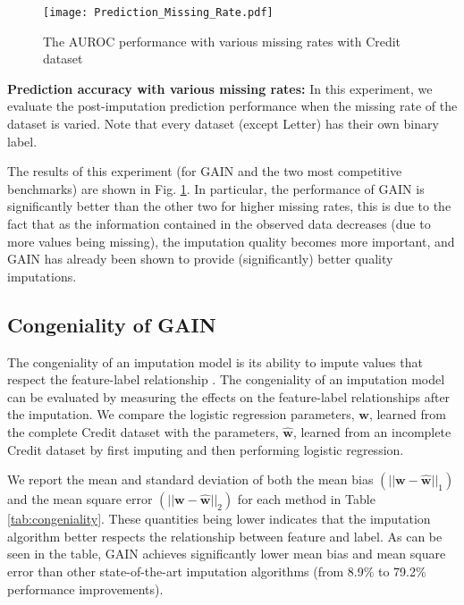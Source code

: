 \documentclass{article}
\begin{document}
\begin{figure}[t!]
	\center
	\texttt{[image: Prediction\_Missing\_Rate.pdf]}
	\caption{The AUROC performance with various missing rates with Credit dataset}
	\label{fig:prediction_missing_rate}
\end{figure}

\textbf{Prediction accuracy with various missing rates: }In this experiment, we evaluate the post-imputation prediction performance when the missing rate of the dataset is varied. Note that every dataset (except Letter) has their own binary label.

The results of this experiment (for GAIN and the two most competitive benchmarks) are shown in Fig. \ref{fig:prediction_missing_rate}. In particular, the performance of GAIN is significantly better than the other two for higher missing rates, this is due to the fact that as the information contained in the observed data decreases (due to more values being missing), the imputation quality becomes more important, and GAIN has already been shown to provide (significantly) better quality imputations.

\subsection{Congeniality of GAIN}



The congeniality of an imputation model is its ability to impute values that respect the feature-label relationship \cite{congeniality_meng, reason_of_imputation1, reason_of_imputation2}. The congeniality of an imputation model can be evaluated by measuring the effects on the feature-label relationships after the imputation. We compare the logistic regression parameters, $\mathbf{w}$, learned from the complete Credit dataset with the parameters, $\hat{\mathbf{w}}$, learned from an incomplete Credit dataset by first imputing and then performing logistic regression.

We report the mean and standard deviation of both the mean bias $(||\mathbf{w} - \hat{\mathbf{w}}||_1)$ and the mean square error $(||\mathbf{w} - \hat{\mathbf{w}}||_2)$ for each method in Table \ref{tab:congeniality}. These quantities being lower indicates that the imputation algorithm better respects the relationship between feature and label. As can be seen in the table, GAIN achieves significantly lower mean bias and mean square error than other state-of-the-art imputation algorithms (from 8.9\% to 79.2\% performance improvements).
\end{document}
